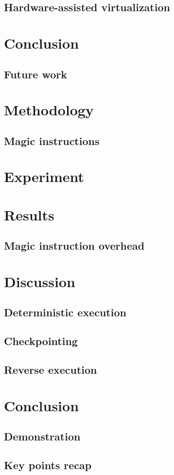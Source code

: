 \documentclass{beamer}
\begin{document}
        \subsection{Hardware-assisted virtualization}
        
        

        \section{Conclusion}

        \subsection{Future work}
	
                
	\section{Methodology}
	\subsection{Magic instructions}
	

	\section{Experiment}

	\section{Results}
	\subsection{Magic instruction overhead}
	

	\section{Discussion}
	\subsection{Deterministic execution}
	
	\subsection{Checkpointing}
	
	\subsection{Reverse execution}
	

	\section{Conclusion}
	\subsection{Demonstration}
	
	\subsection{Key points recap}
	
\end{document}
